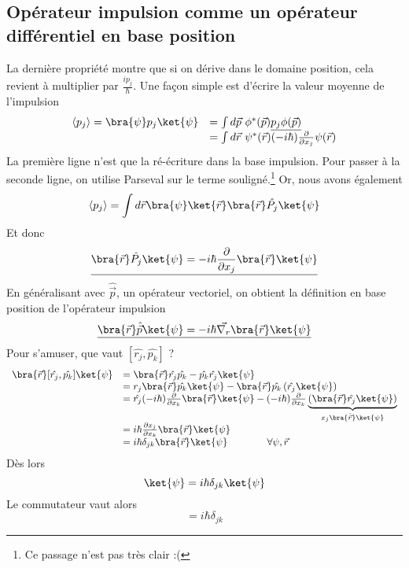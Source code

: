 	\subsection{Opérateur impulsion comme un opérateur différentiel en base position}
	La dernière propriété montre que si on dérive dans le domaine position, 
	cela revient à multiplier par $\frac{ip_j}{\hbar}$.  Une façon simple est d'écrire la valeur moyenne de 	
	l'impulsion
	\begin{equation}
	\begin{array}{ll}
	\langle p_j\rangle = \bra{\psi}p_j\ket{\psi} &= \int d\vec{p}\ \phi^*(\vec{p})\underline{p_j\phi(\vec{p})}\\
	&= \int d\vec{r}\ \psi^*(\vec{r})(-i\hbar)\frac{\partial}{\partial x_j}\psi(\vec{r})
	\end{array}
	\end{equation}	
	La première ligne n'est que la ré-écriture dans la base impulsion. Pour passer à la seconde ligne, 
	on utilise Parseval sur le terme souligné.\footnote{Ce passage n'est pas très clair :(}
	 Or, nous avons également
	\begin{equation}
	\langle p_j\rangle = \int d\vec{r}	 \bra{\psi}\ket{\vec{r}}\bra{\vec{r}}\hat{P_j}\ket{\psi}
	\end{equation}
	Et donc
	\begin{equation}
	\underline{\bra{\vec{r}}\hat{P_j}\ket{\psi} = -i\hbar\dfrac{\partial}{\partial x_j}\bra{\vec{r}}\ket{\psi}}
	\end{equation}
	En généralisant avec $\hat{\vec{p}}$, un opérateur vectoriel, on obtient la définition en
	base position de l'opérateur impulsion
	\begin{equation}
	\underline{\bra{\vec{r}}\hat{\vec{p}}\ket{\psi} = -i\hbar\vec{\nabla_r}\bra{\vec{r}}\ket{\psi}}
	\end{equation}
	Pour s'amuser, que vaut $[\hat{r_j},\hat{p_k}]$ ? 
	\begin{equation}
	\begin{array}{ll}
	\bra{\vec{r}}[\hat{r_j},\hat{p_k}]\ket{\psi} &= \bra{\vec{r}}\hat{r_j}\hat{p_k}-\hat{p_k}\hat{r_j}\ket{\psi}\\
	&= r_j\bra{\vec{r}}\hat{p_k}\ket{\psi}-\bra{\vec{r}}\hat{p_k}\left(\hat{r_j}\ket{\psi}\right)\\
	&= \hat{r_j}(-i\hbar)\frac{\partial}{\partial x_k}\bra{\vec{r}}\ket{\psi}-(-i\hbar)\frac{\partial}{\partial
	 x_k}\underbrace{\left(\bra{\vec{r}}\hat{r_j}\ket{\psi}\right)}_{x_j\bra{\hat{\vec{r}}}\ket{\psi}}\\

	&= i\hbar\frac{\partial x_j}{\partial x_k}\bra{\vec{r}}\ket{\psi}\\
	&= i\hbar\delta_{jk}\bra{\vec{r}}\ket{\psi}\qquad\qquad\forall \psi,\vec{r}
	\end{array}
	\end{equation}
	Dès lors
	\begin{equation}
	[\hat{r_j},\hat{p_k}]\ket{\psi} = i\hbar\delta_{jk}\ket{\psi}
	\end{equation}
	Le commutateur vaut alors
	\begin{equation}
	[\hat{r_j},\hat{p_k}] = i\hbar\delta_{jk}
	\end{equation}
	
